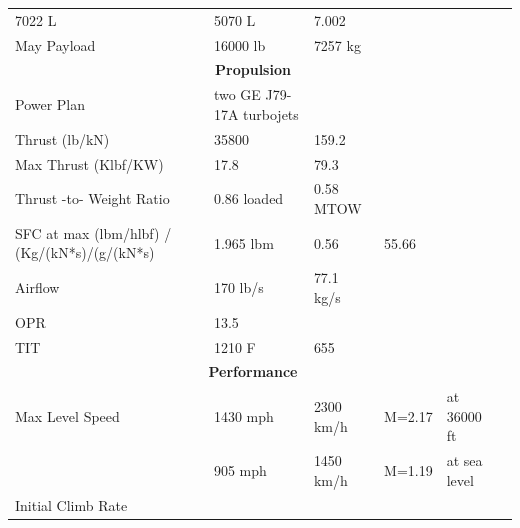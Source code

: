 \documentclass[12pt]{report}
\begin{document}
\begin{table}[H]
{\begin{tabular}{|lllll|l}
  \multicolumn{1}{l|}{7022 L} &
  \multicolumn{1}{l|}{5070 L} &
  \multicolumn{1}{l|}{7.002} &
   &
   \\ \cline{1-5}
\multicolumn{1}{|l|}{May Payload} &
  \multicolumn{1}{l|}{16000 lb} &
  \multicolumn{1}{l|}{7257 kg} &
  \multicolumn{1}{l|}{} &
   &
   \\ \cline{1-5}
\multicolumn{5}{|c|}{\cellcolor[HTML]{9B9B9B}\textbf{Propulsion}} &
   \\ \cline{1-5}
\multicolumn{1}{|l|}{Power Plan} &
  \multicolumn{1}{l|}{two GE J79-17A turbojets} &
  \multicolumn{1}{l|}{} &
  \multicolumn{1}{l|}{} &
   &
   \\ \cline{1-5}
\multicolumn{1}{|l|}{Thrust (lb/kN)} &
  \multicolumn{1}{l|}{35800} &
  \multicolumn{1}{l|}{159.2} &
  \multicolumn{1}{l|}{} &
   &
   \\ \cline{1-5}
\multicolumn{1}{|l|}{Max Thrust (Klbf/KW)} &
  \multicolumn{1}{l|}{17.8} &
  \multicolumn{1}{l|}{79.3} &
  \multicolumn{1}{l|}{} &
   &
   \\ \cline{1-5}
\multicolumn{1}{|l|}{Thrust -to- Weight Ratio} &
  \multicolumn{1}{l|}{0.86 loaded} &
  \multicolumn{1}{l|}{0.58 MTOW} &
  \multicolumn{1}{l|}{} &
   &
   \\ \cline{1-5}
\multicolumn{1}{|l|}{SFC at max (lbm/hlbf) / (Kg/(kN*s)/(g/(kN*s)} &
  \multicolumn{1}{l|}{1.965 lbm} &
  \multicolumn{1}{l|}{0.56} &
  \multicolumn{1}{l|}{55.66} &
   &
   \\ \cline{1-5}
\multicolumn{1}{|l|}{Airflow} &
  \multicolumn{1}{l|}{170 lb/s} &
  \multicolumn{1}{l|}{77.1 kg/s} &
  \multicolumn{1}{l|}{} &
   &
   \\ \cline{1-5}
\multicolumn{1}{|l|}{OPR} &
  \multicolumn{1}{l|}{13.5} &
  \multicolumn{1}{l|}{} &
  \multicolumn{1}{l|}{} &
   &
   \\ \cline{1-5}
\multicolumn{1}{|l|}{TIT} &
  \multicolumn{1}{l|}{1210 F} &
  \multicolumn{1}{l|}{655} &
  \multicolumn{1}{l|}{} &
   &
   \\ \cline{1-5}
\multicolumn{5}{|c|}{\cellcolor[HTML]{9B9B9B}\textbf{Performance}} &
   \\ \cline{1-5}
\multicolumn{1}{|l|}{Max Level Speed} &
  \multicolumn{1}{l|}{1430 mph} &
  \multicolumn{1}{l|}{2300 km/h} &
  \multicolumn{1}{l|}{M=2.17} &
  at 36000 ft &
   \\ \cline{1-5}
\multicolumn{1}{|l|}{} &
  \multicolumn{1}{l|}{905 mph} &
  \multicolumn{1}{l|}{1450 km/h} &
  \multicolumn{1}{l|}{M=1.19} &
  at sea level &
   \\ \cline{1-5}
\multicolumn{1}{|l|}{Initial Climb Rate} &

\end{tabular}}
\end{table}
\end{document}
